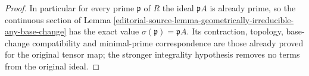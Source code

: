 \begin{proof}
In particular for every prime
$\mathfrak p$ of $R$ the ideal
$\mathfrak pA$ is already prime,
so the continuous section of
Lemma
\ref{editorial-source-lemma-geometrically-irreducible-any-base-change}
has the exact value
$\sigma(\mathfrak p)=\mathfrak pA$.
Its contraction, topology,
base-change compatibility and
minimal-prime correspondence
are those already proved for
the original tensor map;
the stronger integrality
hypothesis removes no terms
from the original ideal.
\end{proof}